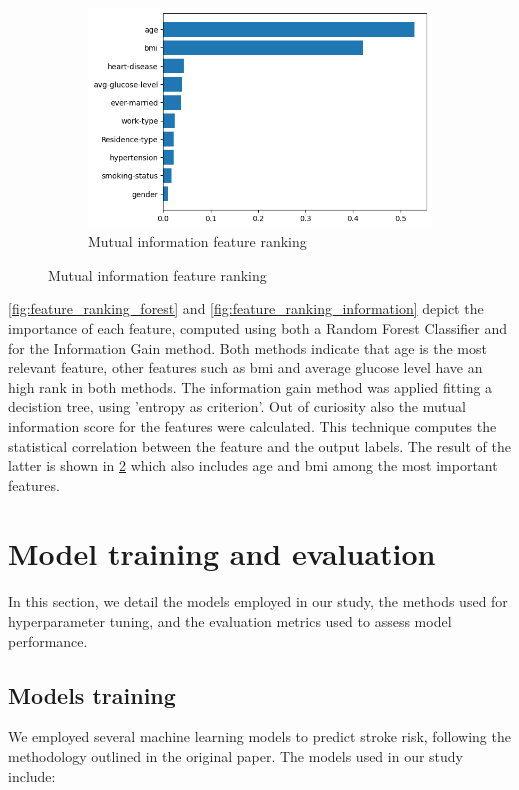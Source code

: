 \documentclass[twocolumn, 9pt]{extarticle}
\begin{document}
\begin{figure}[ht]
    \begin{subfigure}[b]{\linewidth}
    \includegraphics[scale=0.4]{images/mutual_information_gain.png}
    \caption{Mutual information feature ranking}
    \label{fig:feature_ranking_mutual_info}
    \end{subfigure}
\end{figure}

\ref{fig:feature_ranking_forest} and \ref{fig:feature_ranking_information} depict the importance of each feature, computed using both a Random Forest Classifier and for the Information Gain method. Both methods indicate that age is the most relevant feature, other features such as bmi and average glucose level have an high rank in both methods. The information gain method was applied fitting a decistion tree, using 'entropy as criterion'. Out of curiosity also the mutual information score for the features were calculated. This technique computes the statistical correlation between the feature and the output labels. The result of the latter is shown in \ref{fig:feature_ranking_mutual_info} which also includes age and bmi among the most important features. 

\section{Model training and evaluation}
In this section, we detail the models employed in our study, the methods used for hyperparameter tuning, and the evaluation metrics used to assess model performance.

\subsection{Models training}
We employed several machine learning models to predict stroke risk, following the methodology outlined in the original paper. The models used in our study include:
\end{document}
